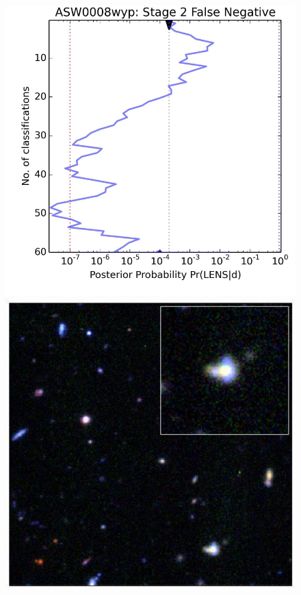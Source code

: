 \documentclass[useAMS,usenatbib,a4paper]{mn2e}
\begin{document}
\begin{figure}
\begin{minipage}{\linewidth}
\begin{minipage}[t]{0.47\linewidth}
\begin{minipage}{0.50\linewidth}
      \centering\includegraphics[width=\linewidth]{ASW0008wyp_stage2_trajectory.pdf}
    \end{minipage}
  \end{minipage}\hfill
  \begin{minipage}[t]{0.47\linewidth}
    \begin{minipage}{0.46\linewidth}
      \centering\includegraphics[width=\linewidth]{ASW0006rkx_gri.pdf}

\end{minipage}
\end{minipage}
\end{minipage}
\end{figure}
\end{document}
